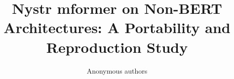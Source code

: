 \title{\textbf{Nystr mformer on Non-BERT Architectures: A Portability and Reproduction Study}}

\author{Anonymous authors}
